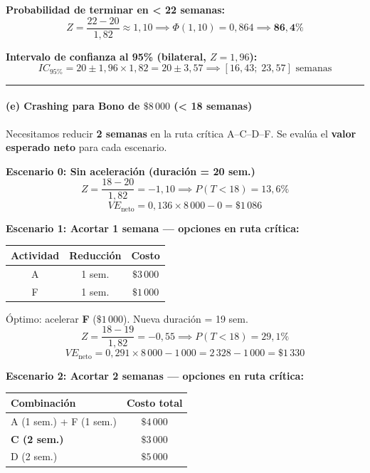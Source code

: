 \documentclass[
]{article}
\begin{document}
\textbf{Probabilidad de terminar en \textless{} 22 semanas:}
\[Z = \frac{22 - 20}{1{,}82} \approx 1{,}10 \implies \Phi(1{,}10) = 0{,}864 \implies \mathbf{86{,}4\%}\]

\textbf{Intervalo de confianza al 95\% (bilateral, \(Z = 1{,}96\)):}
\[IC_{95\%} = 20 \pm 1{,}96 \times 1{,}82 = 20 \pm 3{,}57 \implies [16{,}43;\; 23{,}57] \text{ semanas}\]

\begin{center}\rule{0.5\linewidth}{0.5pt}\end{center}

\hypertarget{e-crashing-para-bono-de-8000-18-semanas}{%
\paragraph{\texorpdfstring{(e) Crashing para Bono de \(\$8\,000\)
(\textless{} 18
semanas)}{(e) Crashing para Bono de \textbackslash\$8\textbackslash,000 (\textless{} 18 semanas)}}\label{e-crashing-para-bono-de-8000-18-semanas}}

Necesitamos reducir \textbf{2 semanas} en la ruta crítica A--C--D--F. Se
evalúa el \textbf{valor esperado neto} para cada escenario.

\textbf{Escenario 0: Sin aceleración (duración = 20 sem.)}
\[Z = \frac{18 - 20}{1{,}82} = -1{,}10 \implies P(T < 18) = 13{,}6\%\]
\[VE_{\text{neto}} = 0{,}136 \times 8\,000 - 0 = \$1\,086\]

\textbf{Escenario 1: Acortar 1 semana --- opciones en ruta crítica:}

\begin{longtable}[]{@{}ccc@{}}
\toprule\noalign{}
Actividad & Reducción & Costo \\
\midrule\noalign{}
\endhead
\bottomrule\noalign{}
\endlastfoot
A & 1 sem. & \(\$3\,000\) \\
F & 1 sem. & \(\$1\,000\) \\
\end{longtable}

Óptimo: acelerar \textbf{F} (\(\$1\,000\)). Nueva duración = 19 sem.
\[Z = \frac{18 - 19}{1{,}82} = -0{,}55 \implies P(T < 18) = 29{,}1\%\]
\[VE_{\text{neto}} = 0{,}291 \times 8\,000 - 1\,000 = 2\,328 - 1\,000 = \$1\,330\]

\textbf{Escenario 2: Acortar 2 semanas --- opciones en ruta crítica:}

\begin{longtable}[]{@{}lc@{}}
\toprule\noalign{}
Combinación & Costo total \\
\midrule\noalign{}
\endhead
\bottomrule\noalign{}
\endlastfoot
A (1 sem.) + F (1 sem.) & \(\$4\,000\) \\
\textbf{C (2 sem.)} & \textbf{\(\$3\,000\)} \\
D (2 sem.) & \(\$5\,000\) \\
\end{longtable}
\end{document}
